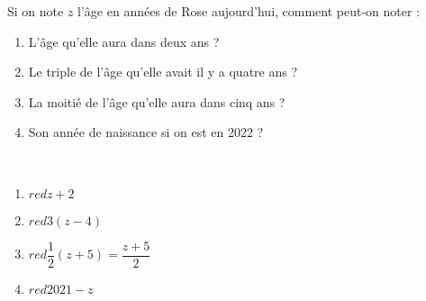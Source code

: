 \begin{exercice}
   Si on note $z$ l'âge en années de Rose aujourd'hui, comment peut-on noter :
   \begin{enumerate}
      \item L'âge qu'elle aura dans deux ans ?
      \item Le triple de l'âge qu'elle avait il y a quatre ans ?
      \item La moitié de l'âge qu'elle aura dans cinq ans ?
      \item Son année de naissance si on est en 2022 ?
   \end{enumerate}
\end{exercice}

\begin{corrige}
   \ \\ [-5mm]
   \begin{enumerate}
      \item $red z+2$
      \item $red 3(z-4)$
      \item $red \dfrac12(z+5) =\dfrac{z+5}{2}$ \smallskip
      \item $red 2021-z$
   \end{enumerate}
\end{corrige}